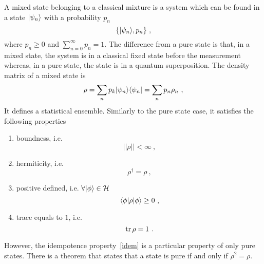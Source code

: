     A mixed state belonging to a classical mixture is a system which can be found in a state $\vert\psi_n\rangle$ with a probability $p_n$
    \begin{equation*}
        \{\vert\psi_n\rangle, p_n\} ~,
    \end{equation*}
    where $p_n \geq 0$ and $\sum_{n=0}^{\infty} p_n = 1$. The difference from a pure state is that, in a mixed state, the system is in a classical fixed state before the measurement whereas, in a pure state, the state is in a quantum superposition. The density matrix of a mixed state is 
    \begin{equation}\label{mix}
        \rho = \sum_n p_k \vert\psi_n\rangle \langle\psi_n\vert = \sum_n p_n \rho_n ~,
    \end{equation}
    It defines a statistical ensemble. Similarly to the pure state case, it satisfies the following properties
    \begin{enumerate}
        \item boundness, i.e. 
            \begin{equation*}
                ||\rho|| < \infty~,
            \end{equation*}
        \item hermiticity, i.e. 
            \begin{equation*}
                \rho^\dagger = \rho ~,
            \end{equation*}
        \item positive defined, i.e. $\forall \vert\phi\rangle \in \mathcal H$
            \begin{equation*}
                \langle\phi\vert \rho \vert\phi\rangle \geq 0 ~,
            \end{equation*}
        \item trace equals to $1$, i.e. 
            \begin{equation*}
                \operatorname{tr} \rho = 1 ~.
            \end{equation*}
    \end{enumerate}
    However, the idempotence property~\eqref{idem} is a particular property of only pure states. There is a theorem that states that a state is pure if and only if $\rho^2 = \rho$.
